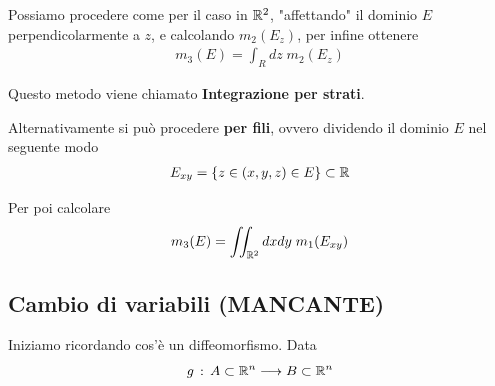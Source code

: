 Possiamo procedere come per il caso in $\mathbb{R}^2$, "affettando" il dominio $E$ perpendicolarmente a $z$, e calcolando $m_2(E_z)$, per infine ottenere
\begin{align}
	m_3(E)= \int_{R} dz \; m_2(E_z)
\end{align}

Questo metodo viene chiamato \textbf{Integrazione per strati}.

\begin{figure}[!htb]
\end{figure}

Alternativamente si può procedere \textbf{per fili}, ovvero dividendo il dominio $E$ nel seguente modo
\begin{align}
	E_{xy} = \{ z \in (x,y,z)\in E \}\subset \mathbb{R}  
\end{align}

Per poi calcolare
\begin{align}
	m_3(E)= \iint_{\mathbb{R}^2} dxdy \; m_1(E_{xy})
\end{align}

\begin{figure}[!htb]
\end{figure}

\subsection{Cambio di variabili (MANCANTE)}

Iniziamo ricordando cos'è un diffeomorfismo. Data
\begin{align}
	g \, : \, A \subset \mathbb{R}^n \longrightarrow B \subset \mathbb{R}^n
\end{align}

